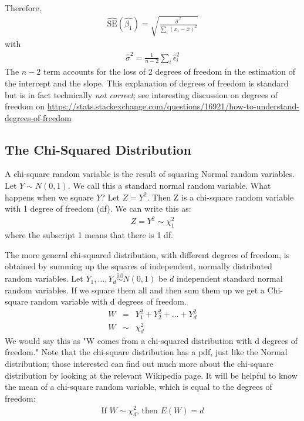 \documentclass[11pt]{article}
\theoremstyle{remark}
\begin{document}
Therefore,
\begin{eqnarray}
\widehat{\text{SE}}(\hat{\beta_1}) = \sqrt{\frac{\hat{\sigma}^2}{\sum_i (x_i - \bar{x})^2}}
\end{eqnarray}
with
\begin{eqnarray}
\hat{\sigma}^2 = \frac{1}{n-2} \sum_i \hat{\epsilon}_i^2
\end{eqnarray}
The $n-2$ term accounts for the loss of 2 degrees of freedom in the estimation of the intercept and the slope. This explanation of degrees of freedom is standard but is in fact technically \emph{not correct}; see interesting discussion on degrees of freedom on \url{https://stats.stackexchange.com/questions/16921/how-to-understand-degrees-of-freedom}


\pagebreak
\subsection{The Chi-Squared Distribution}\label{SectionChiSquare}
A chi-square random variable is the result of squaring Normal random variables.  Let $Y\sim N(0,1)$. We call this a standard normal random variable. What happens when we square $Y$?  Let $Z=Y^2$.  Then Z is a chi-square random variable with 1 degree of freedom (df).  We can write this as:
\begin{eqnarray}
Z=Y^2 \sim \chi_1^2
\end{eqnarray}
where the subscript 1 means that there is 1 df.

The more general chi-squared distribution, with different degrees of freedom, is obtained by summing up the squares of independent, normally distributed random variables.
Let $Y_1,\hdots,Y_d\overset{\mathrm{iid}}{\sim}N(0,1)$ be $d$ independent standard normal random variables. If we square them all and then sum them up we get a Chi-square random variable with d degrees of freedom.
\begin{eqnarray}
W&=&Y_1^2+Y_2^2+\hdots+Y_d^2\nonumber\\
W&\sim&\chi_d^2
\end{eqnarray}
We would say this as "W comes from a chi-squared distribution with d degrees of freedom."  Note that the chi-square distribution has a pdf, just like the Normal distribution; those interested can find out much more about the chi-square distribution by looking at the relevant Wikipedia page.  It will be helpful to know the mean of a chi-square random variable, which is equal to the degrees of freedom:
\begin{eqnarray}
\text{If $W\sim\chi_d^2$, then $E(W)=d$}
\end{eqnarray}
\end{document}
